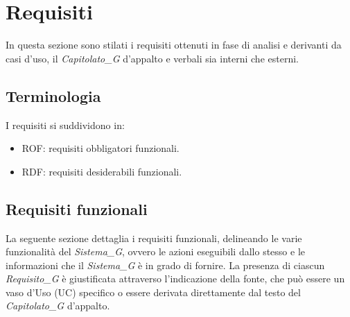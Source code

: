 \documentclass[12pt, oneside]{article}
\begin{document}














\newpage











%
%

%

%

\section{Requisiti}
In questa sezione sono stilati i requisiti ottenuti in fase di analisi e derivanti da casi d'uso, il \textit{Capitolato_G} d'appalto e verbali sia interni che esterni. 
\subsection{Terminologia}
I requisiti si suddividono in:
\begin{itemize}
    \item ROF: requisiti obbligatori funzionali.
    \item RDF: requisiti desiderabili funzionali.
\end{itemize}
\subsection{Requisiti funzionali}
La seguente sezione dettaglia i requisiti funzionali, delineando le varie funzionalità del \textit{Sistema_G}, ovvero le azioni eseguibili dallo stesso e le informazioni che il \textit{Sistema_G} è in grado di fornire. La presenza di ciascun \textit{Requisito_G} è giustificata attraverso l'indicazione della fonte, che può essere un vaso d'Uso (UC) specifico o essere derivata direttamente dal testo del \textit{Capitolato_G} d'appalto.
\end{document}
